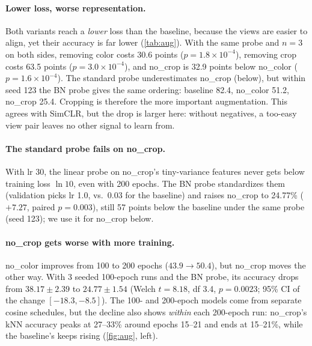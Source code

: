 \documentclass[10pt,twocolumn,letterpaper]{article}
\begin{document}
\paragraph{Lower loss, worse representation.}
Both variants reach a \emph{lower} loss than the baseline, because the views are easier to align, yet their accuracy is far lower (\cref{tab:aug}).
With the same probe and $n{=}3$ on both sides, removing color costs 30.6 points ($p{=}1.8\!\times\!10^{-4}$), removing crop costs 63.5 points ($p{=}3.0\!\times\!10^{-4}$), and no\_crop is 32.9 points below no\_color ($p{=}1.6\!\times\!10^{-4}$).
The standard probe underestimates no\_crop (below), but within seed 123 the BN probe gives the same ordering: baseline 82.4, no\_color 51.2, no\_crop 25.4.
Cropping is therefore the more important augmentation. This agrees with SimCLR, but the drop is larger here: without negatives, a too-easy view pair leaves no other signal to learn from.

\paragraph{The standard probe fails on no\_crop.}
With lr 30, the linear probe on no\_crop's tiny-variance features never gets below training loss $\ln 10$, even with 200 epochs.
The BN probe standardizes them (validation picks lr 1.0, vs.\ 0.03 for the baseline) and raises no\_crop to 24.77\% ($+7.27$, paired $p{=}0.003$), still 57 points below the baseline under the same probe (seed 123); we use it for no\_crop below.

\paragraph{no\_crop gets worse with more training.}
no\_color improves from 100 to 200 epochs ($43.9\rightarrow50.4$), but no\_crop moves the other way.
With 3 seeded 100-epoch runs and the BN probe, its accuracy drops from $38.17\pm2.39$ to $24.77\pm1.54$ (Welch $t{=}8.18$, df 3.4, $p{=}0.0023$; 95\% CI of the change $[-18.3,-8.5]$).
The 100- and 200-epoch models come from separate cosine schedules, but the decline also shows \emph{within} each 200-epoch run: no\_crop's kNN accuracy peaks at 27--33\% around epochs 15--21 and ends at 15--21\%, while the baseline's keeps rising (\cref{fig:aug}, left).
\end{document}
